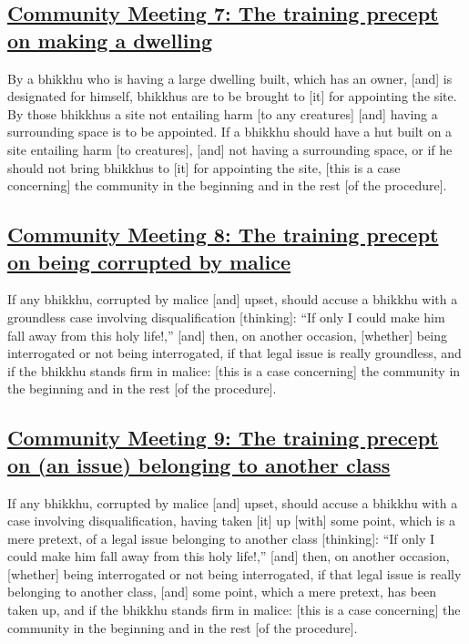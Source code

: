 \subsection*{\hyperref[sd7]{Community Meeting 7: The training precept on making a dwelling}}
\label{comm7}

By a bhikkhu who is having a large dwelling built, which has an owner, [and] is designated for himself, bhikkhus are to be brought to [it] for appointing the site. By those bhikkhus a site not entailing harm [to any creatures] [and] having a surrounding space is to be appointed. If a bhikkhu should have a hut built on a site entailing harm [to creatures], [and] not having a surrounding space, or if he should not bring bhikkhus to [it] for appointing the site, [this is a case concerning] the community in the beginning and in the rest [of the procedure].



\subsection*{\hyperref[sd8]{Community Meeting 8: The training precept on being corrupted by malice}}
\label{comm8}

If any bhikkhu, corrupted by malice [and] upset, should accuse a bhikkhu with a groundless case involving disqualification [thinking]: ``If only I could make him fall away from this holy life!,'' [and] then, on another occasion, [whether] being interrogated or not being interrogated, if that legal issue is really groundless, and if the bhikkhu stands firm in malice: [this is a case concerning] the community in the beginning and in the rest [of the procedure].



\subsection*{\hyperref[sd9]{Community Meeting 9: The training precept on (an issue) belonging to another class}}
\label{comm9}

If any bhikkhu, corrupted by malice [and] upset, should accuse a bhikkhu with a case involving disqualification, having taken [it] up [with] some point, which is a mere pretext, of a legal issue belonging to another class [thinking]: ``If only I could make him fall away from this holy life!,'' [and] then, on another occasion, [whether] being interrogated or not being interrogated, if that legal issue is really belonging to another class, [and] some point, which a mere pretext, has been taken up, and if the bhikkhu stands firm in malice: [this is a case concerning] the community in the beginning and in the rest [of the procedure].



